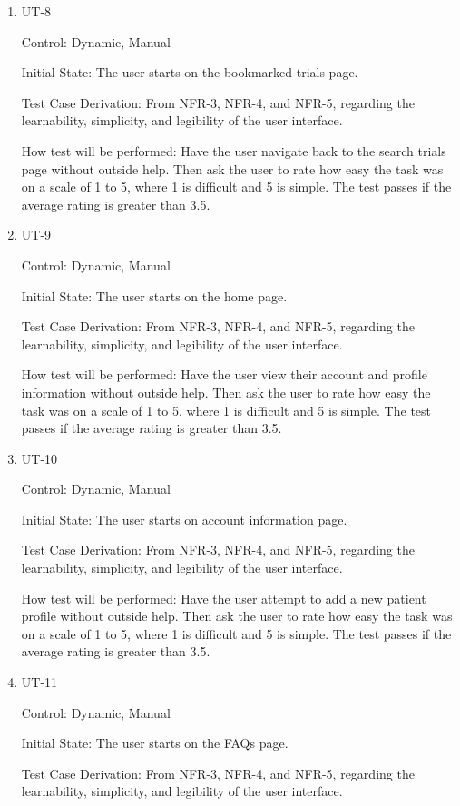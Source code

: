\documentclass[12pt, titlepage]{article}
\begin{document}
\begin{enumerate}
\item{UT-8}

Control: Dynamic, Manual
					
Initial State: The user starts on the bookmarked trials page.

Test Case Derivation: From NFR-3, NFR-4, and NFR-5, regarding the learnability, simplicity, and legibility of the user interface.

How test will be performed: Have the user navigate back to the search trials page without outside help. Then ask the user to 
rate how easy the task was on a scale of 1 to 5, where 1 is difficult and 5 is simple. The test passes if the average 
rating is greater than 3.5.

\item{UT-9}

Control: Dynamic, Manual
					
Initial State: The user starts on the home page.

Test Case Derivation: From NFR-3, NFR-4, and NFR-5, regarding the learnability, simplicity, and legibility of the user interface.

How test will be performed: Have the user view their account and profile information without outside help. Then ask the user to 
rate how easy the task was on a scale of 1 to 5, where 1 is difficult and 5 is simple. The test passes if the average 
rating is greater than 3.5.

\item{UT-10}

Control: Dynamic, Manual
					
Initial State: The user starts on account information page.

Test Case Derivation: From NFR-3, NFR-4, and NFR-5, regarding the learnability, simplicity, and legibility of the user interface.

How test will be performed: Have the user attempt to add a new patient profile without outside help. Then ask the user to 
rate how easy the task was on a scale of 1 to 5, where 1 is difficult and 5 is simple. The test passes if the average 
rating is greater than 3.5.

\item{UT-11}

Control: Dynamic, Manual
					
Initial State: The user starts on the FAQs page.

Test Case Derivation: From NFR-3, NFR-4, and NFR-5, regarding the learnability, simplicity, and legibility of the user interface.


\end{enumerate}
\end{document}
